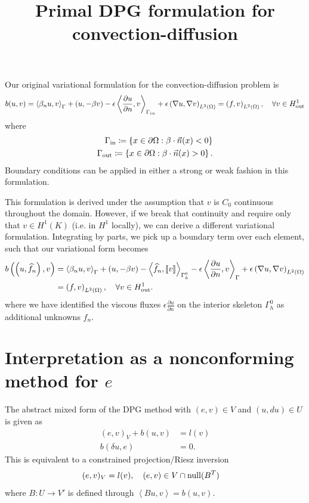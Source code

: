 \documentclass[final,leqno]{siamltex}
\title{Primal DPG formulation for convection-diffusion}
\author{}
\date{}
\newcommand{\LRp}[1]{\left( #1 \right)}
\newcommand{\LRs}[1]{\left[ #1 \right]}
\newcommand{\LRa}[1]{\left\langle #1 \right\rangle}
\newcommand{\LRc}[1]{\left\{ #1 \right\}}
\newcommand{\Grad} {\ensuremath{\nabla}}
\newcommand{\jump}[1] {\ensuremath{\LRs{\!\left[#1\right]\!}}}
\newcommand{\fnh}{\widehat{f}_n}
\renewcommand{\L}{L^2\LRp{\Omega}}
\newcommand{\Gh}{\Gamma_h}
\let\grad\relax
\newcommand{\grad}{\nabla}
\newcommand{\pd}[2]{\frac{\partial#1}{\partial#2}}
\newcommand{\Gin} {\Gamma_{in}}
\newcommand{\outsub}{{\rm out}}
\begin{document}
Our original variational formulation for the convection-diffusion problem is 
\[
b(u,v) = \LRa{\beta_n u,v}_{\Gamma} + \LRp{u,-\beta \grad v} - \epsilon \LRa{\pd{u}{n},v}_{\Gin} + \epsilon\LRp{\Grad u, \Grad v}_{\L} = \LRp{f,v}_{\L} , \quad \forall v \in H^1_\outsub
\]
where 
\begin{align*}
\Gamma_{\rm in}\coloneqq \LRc{x\in \partial \Omega: \beta\cdot\vec{n}(x) < 0}\\
\Gamma_{\rm out}\coloneqq \LRc{x\in \partial \Omega: \beta\cdot\vec{n}(x) > 0}.
\end{align*}
Boundary conditions can be applied in either a strong or weak fashion in this formulation.  

This formulation is derived under the assumption that $v$ is $C_0$ continuous throughout the domain.  However, if we break that continuity and require only that $v\in H^1(K)$ (i.e. in $H^1$ locally), we can derive a different variational formulation.  Integrating by parts, we pick up a boundary term over each element, such that our variational form becomes
\begin{align*}
b\LRp{\LRp{u,\fnh},v} &= \LRa{\beta_n u,v}_{\Gamma} + \LRp{u,-\beta \grad v} - \LRa{\fnh,\jump{v}}_{\Gh^0} - \epsilon \LRa{\pd{u}{n},v}_{\Gamma} + \epsilon\LRp{\Grad u, \Grad v}_{\L} \\
&= \LRp{f,v}_{\L} , \quad \forall v \in H^1_\outsub.
\end{align*}
where we have identified the viscous fluxes $\epsilon\pd{u}{n}$ on the interior skeleton $\Gh^0$ as additional unknowns $\fnh$.  

\section{Interpretation as a nonconforming method for $e$}

The abstract mixed form of the DPG method with $(e,v)\in V$ and $(u,du)\in U$ is given as
\begin{align*}
(e,v)_V + b(u,v) &= l(v)\\
b(\delta u,e) &= 0.
\end{align*}
This is equivalent to a constrained projection/Riesz inversion 
\begin{align*}
(e,v)_V &= l(v), \quad (e,v) \in V\cap{\rm null}(B^T)
\end{align*}
where $B: U\rightarrow V'$ is defined through $\LRa{Bu,v} = b(u,v)$.  
\end{document}
